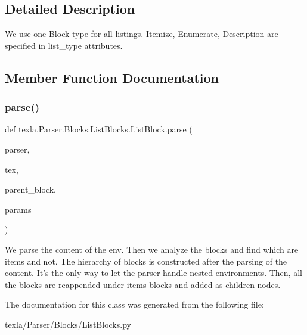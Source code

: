 \subsection{Detailed Description}
\begin{DoxyVerb}We use one Block type for all listings.
Itemize, Enumerate, Description are
specified in list_type attributes.
\end{DoxyVerb}
 

\subsection{Member Function Documentation}
\hypertarget{classtexla_1_1Parser_1_1Blocks_1_1ListBlocks_1_1ListBlock_aaf69903ae29fb0d00539f91c6db5a656}{}\label{classtexla_1_1Parser_1_1Blocks_1_1ListBlocks_1_1ListBlock_aaf69903ae29fb0d00539f91c6db5a656} 
\subsubsection{\texorpdfstring{parse()}{parse()}}
{\footnotesize\ttfamily def texla.\+Parser.\+Blocks.\+List\+Blocks.\+List\+Block.\+parse (\begin{DoxyParamCaption}\item[{}]{parser,  }\item[{}]{tex,  }\item[{}]{parent\+\_\+block,  }\item[{}]{params }\end{DoxyParamCaption})\hspace{0.3cm}{\ttfamily [static]}}

\begin{DoxyVerb}We parse the content of the env.
Then we analyze the blocks and find
which are items and not. The hierarchy of
blocks is constructed after the parsing of
the content. It's the only way to let the parser
handle nested environments. Then, all the
blocks are reappended under items blocks and
added as children nodes.
\end{DoxyVerb}
 

The documentation for this class was generated from the following file\+:\begin{DoxyCompactItemize}
\item 
texla/\+Parser/\+Blocks/List\+Blocks.\+py\end{DoxyCompactItemize}
